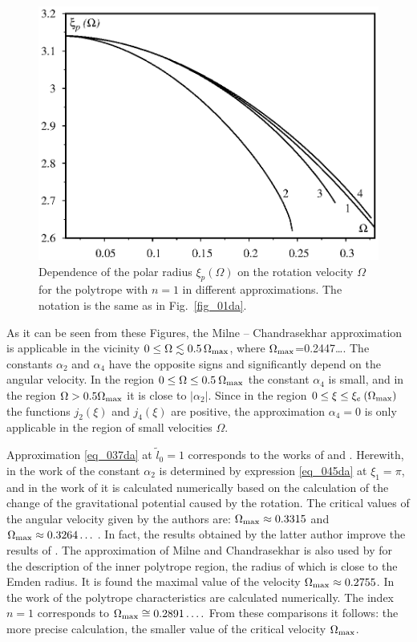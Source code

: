 \documentclass{caosp308}
\begin{document}
\begin{figure}[h!]
\center\includegraphics[width=.7\textwidth]{fig_02.eps}
\caption{Dependence of the polar radius $\xi_{p}(\Omega)$  on the rotation velocity $\Omega$ for the polytrope with $n=1$ in different approximations. The notation is the same as in Fig.~\ref{fig_01da}.}
\label{fig_02da}
\end{figure}
As it can be seen from these Figures, the Milne -- Chandrasekhar approximation  is applicable in the vicinity $0\leq\Omega\lesssim 0.5\,\Omega_{\rm max}$, where $\Omega_{\rm max}$=0.2447\ldots. The constants $\alpha_2$ and $\alpha_4$ have the opposite signs and significantly depend on the angular velocity. In the region $0\leq \Omega\leq 0.5\:\Omega_{\rm max}$ the constant $\alpha_4$ is small, and in the region $\Omega > 0.5 \Omega_{\rm max}$ it is close to $|\alpha_2|$. Since in the region $0 \leq\xi\leq\xi_e \:(\Omega_{\rm max})$ the functions $j_2 (\xi)$ and $j_4 (\xi)$ are positive, the approximation $\alpha_4=0$ is only applicable in the region of small velocities $\Omega$.

Approximation \eqref{eq_037da} at $\tilde{l}_0=1$ corresponds to the works of \citet{1933MNRAS..93..390C} and \citet{1980Ap&SS..71..415C}. Herewith, in the work of \citet{1933MNRAS..93..390C} the constant $\alpha_2$  is determined by expression \eqref{eq_045da} at $\xi_1 =\pi$, and in the work of \citet{1980Ap&SS..71..415C} it is calculated numerically based on the calculation of the change of the gravitational potential caused by the rotation. The critical values of the angular velocity given by the authors are: $\Omega_{\rm max} \approx 0.3315$ \citep{1933MNRAS..93..390C} and $\Omega_{\rm max} \approx 0.3264\ldots$ \citep{1980Ap&SS..71..415C}. In fact, the results obtained by the latter author improve the results of \citet{1933MNRAS..93..390C}. The approximation of Milne and Chandrasekhar \citep{1923MNRAS..83..118M,1933MNRAS..93..390C} is also used by \citep*{1965MNRAS.131...13M} for the description of the inner polytrope region, the radius of which is close to the Emden radius. It is found the maximal value of the velocity $\Omega_{\rm max}\approx 0.2755$. In the work of \citet{1964ApJ...140..552J} the polytrope characteristics are calculated numerically. The index $n=1$ corresponds to $\Omega_{\rm max}\cong 0.2891\ldots.$ From these comparisons it follows: the more precise calculation, the smaller value of the critical velocity $\Omega_{\rm max}$.
\end{document}
